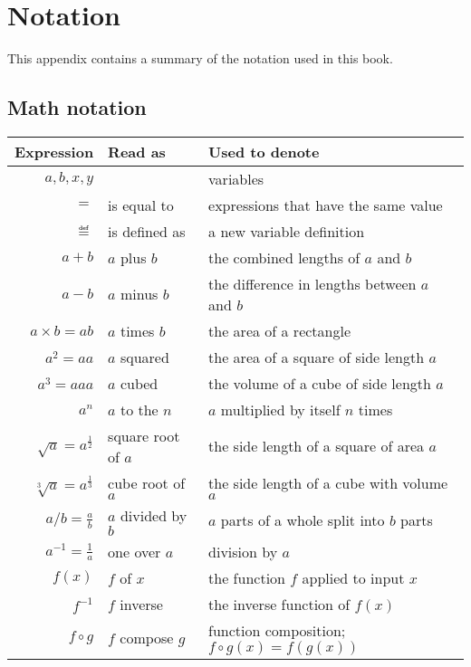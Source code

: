
\chapter{Notation}
\label{appendix:notation}
\vspace{-7mm}

This appendix contains a summary of the notation used in this book.


\section*{Math notation}

\begin{longtable}{rll} 
\toprule
Expression  	&	Read as  	& Used to denote			\\
\midrule
$a,b,x,y$	
	& 
	& variables \\
$=$	
	& is equal to 
	& expressions that have the same value \\ $\eqdef$
	& is defined as 
	& a new variable definition  \\
$a+b$
	& $a$ plus $b$
	& the combined lengths of $a$ and $b$ \\
$a-b$	
	& $a$ minus $b$
	& the difference in lengths between $a$ and $b$ \\
$a\times b = ab$
	& $a$ times $b$
	& the area of a rectangle   \\
$a^2= aa$
	& $a$ squared 
	& the area of a square of side length $a$ \\
$a^3= aaa$
	& $a$ cubed 
	& the volume of a cube of side length $a$ \\
$a^n$
	& $a$ to the $n$
		& $a$ multiplied by itself $n$ times 		\\
$\sqrt{a} = a^{\frac{1}{2}}$
	& square root of $a$
	& the side length of a square of area $a$ \\
$\sqrt[3]{a}= a^{\frac{1}{3}}$
	& cube root of $a$
	& the side length of a cube with volume $a$  \\
$a/b = \frac{a}{b}$
	& $a$ divided by $b$
	& $a$ parts of a whole split into $b$ parts \\
$a^{-1}= \frac{1}{a}$
	& one over $a$
	& division by $a$ 					\\
$f(x)$	
	& $f$ of $x$
	& the function $f$ applied to input $x$ 	\\
$f^{-1}$ 
	& $f$ inverse 
	& the inverse function of $f(x)$   \\
$f \circ g$ 
	& $f$ compose $g$ 
	& function composition; $f \circ g(x) = f(g(x))$   \\

\end{longtable}
